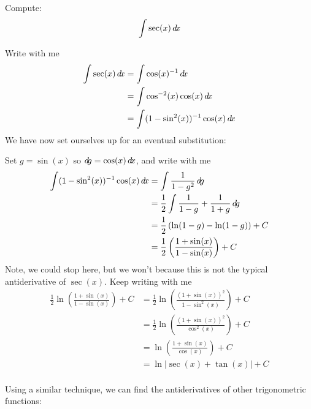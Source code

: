 \documentclass{ximera}
\begin{document}
\begin{example}
  Compute:
  \[
  \int \sec (x) \mathop{}\!d\! x
  \]
  \begin{explanation}
    Write with me
    \begin{align*}
      \int \sec(x) \d x &= \int \cos(x)^{-1} \d x\\
      &= \int \cos^{-2}(x)\cos(x) \d x\\
      &=\int(1-\sin^2(x))^{-1} \cos(x) \d x
    \end{align*}
    We have now set ourselves up for an eventual substitution:
    \begin{center}%
    \end{center}
    Set $g =\sin(x)$ so $\mathop{}\!d\! g = \cos(x) \mathop{}\!d\! x$, and write with me
    \begin{align*}
      \int(1-\sin^2(x))^{-1} \cos(x) \mathop{}\!d\! x &= \int \frac{1}{1-g^2}\mathop{}\!d\! g\\
      &= \frac{1}{2}\int \frac{1}{1-g} + \frac{1}{1+g} \mathop{}\!d\! g\\
      &= \frac{1}{2}\left(\ln(1-g) - \ln(1-g)\right)+C\\
      &= \frac{1}{2}\left(\frac{1+\sin(x)}{1-\sin(x)}\right)+C
    \end{align*}
    Note, we could stop here, but we won't because this is not the
    typical antiderivative of $\sec(x)$. Keep writing with me
    \begin{align*}
      \frac{1}{2}\ln\left(\frac{1+\sin(x)}{1-\sin(x)}\right)+C &= \frac{1}{2}\ln\left(\frac{(1+\sin(x))^2}{1-\sin^2(x)}\right)+C \\
      &= \frac{1}{2}\ln\left(\frac{(1+\sin(x))^2}{\cos^2(x)}\right)+C \\
      &= \ln\left(\frac{1+\sin(x)}{\cos(x)}\right)+C \\
      &= \ln\left|\sec(x) + \tan(x)\right|+C \\
    \end{align*}
  \end{explanation}
\end{example}

Using a similar technique, we can find the antiderivatives of other trigonometric functions:
\end{document}
